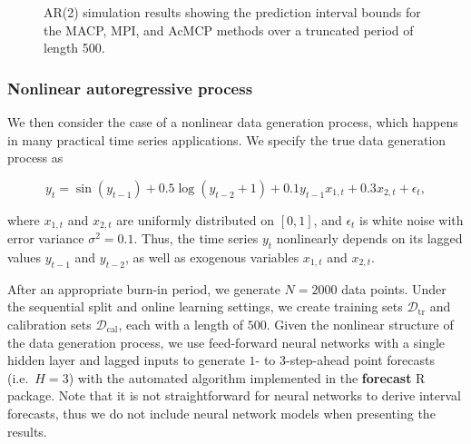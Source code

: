 \documentclass[
  11pt,
  a4paper,
]{article}
\theoremstyle{plain}
\theoremstyle{plain}
\theoremstyle{remark}
\begin{document}
\begin{figure}


\caption{\label{fig-AR2_timeplot}AR(2) simulation results showing the
prediction interval bounds for the MACP, MPI, and AcMCP methods over a
truncated period of length 500.}

\end{figure}%

\subsubsection{Nonlinear autoregressive
process}\label{nonlinear-autoregressive-process}

We then consider the case of a nonlinear data generation process, which
happens in many practical time series applications. We specify the true
data generation process as

\[
y_t = \sin(y_{t-1}) + 0.5\log(y_{t-2} + 1) + 0.1y_{t-1}x_{1,t} + 0.3x_{2,t} + \epsilon_{t},
\]

where \(x_{1,t}\) and \(x_{2,t}\) are uniformly distributed on
\([0,1]\), and \(\epsilon_{t}\) is white noise with error variance
\(\sigma^2 = 0.1\). Thus, the time series \(y_t\) nonlinearly depends on
its lagged values \(y_{t-1}\) and \(y_{t-2}\), as well as exogenous
variables \(x_{1,t}\) and \(x_{2,t}\).

After an appropriate burn-in period, we generate \(N=2000\) data points.
Under the sequential split and online learning settings, we create
training sets \(\mathcal{D}_{\text{tr}}\) and calibration sets
\(\mathcal{D}_{\text{cal}}\), each with a length of \(500\). Given the
nonlinear structure of the data generation process, we use feed-forward
neural networks with a single hidden layer and lagged inputs to generate
\(1\)- to \(3\)-step-ahead point forecasts (i.e.~\(H=3\)) with the
automated algorithm implemented in the \textbf{forecast} R package. Note
that it is not straightforward for neural networks to derive interval
forecasts, thus we do not include neural network models when presenting
the results.
\end{document}
